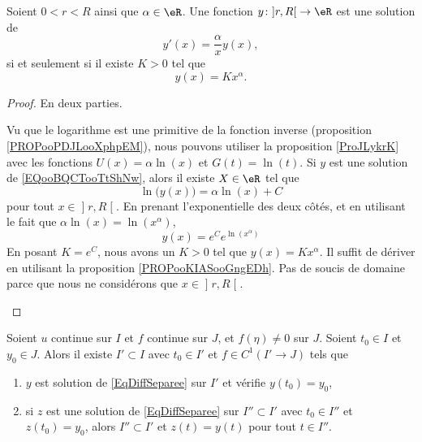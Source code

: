 \begin{proposition}     \label{PROPooIGWTooULXrKI}
	Soient \( 0<r<R\) ainsi que \( \alpha\in \eR\). Une fonction \( y\colon \mathopen] r , R \mathclose[\to \eR\) est une solution de
	\begin{equation}        \label{EQooBQCTooTtShNw}
		y'(x)=\frac{ \alpha }{ x }y(x),
	\end{equation}
	si et seulement si il existe \( K >0\) tel que
	\begin{equation}
		y(x)=Kx^{\alpha}.
	\end{equation}
\end{proposition}

\begin{proof}
	En deux parties.
	\begin{subproof}
		\spitem[\( \Rightarrow\)]
		Vu que le logarithme est une primitive de la fonction inverse (proposition \ref{PROPooPDJLooXphpEM}), nous pouvons utiliser la proposition \ref{ProJLykrK} avec les fonctions \( U(x)=\alpha\ln(x)\) et \( G(t)=\ln(t)\). Si \( y\) est une solution de \eqref{EQooBQCTooTtShNw}, alors il existe \( X\in \eR\) tel que
		\begin{equation}
			\ln\big( y(x) \big)=\alpha\ln(x)+C
		\end{equation}
		pour tout \( x\in\mathopen] r , R \mathclose[\). En prenant l'exponentielle des deux côtés, et en utilisant le fait que \( \alpha\ln(x)=\ln(x^{\alpha})\),
		\begin{equation}
			y(x)= e^{C} e^{\ln(x^{\alpha})}
		\end{equation}
		En posant \( K=e^C\), nous avons un \( K>0\) tel que \( y(x)=Kx^{\alpha}\).
		\spitem[\( \Leftarrow\)]
		Il suffit de dériver en utilisant la proposition \ref{PROPooKIASooGngEDh}. Pas de soucis de domaine parce que nous ne considérons que \( x\in \mathopen] r , R \mathclose[\).
	\end{subproof}
\end{proof}

\begin{proposition} \label{PropOkmXmC}
	Soient \( u\) continue sur \( I\) et \( f\) continue sur \( J\), et \( f(\eta)\neq 0\) sur \( J\). Soient \( t_0\in I\) et \( y_0\in J\). Alors il existe \( I'\subset I\) avec \( t_0\in I'\) et \( f\in C^1(I'\to J)\) tels que
	\begin{enumerate}

		\item
		      \( y\) est solution de \eqref{EqDiffSeparee} sur \( I'\) et vérifie \( y(t_0)=y_0\),
		\item
		      si \( z\) est une solution de \eqref{EqDiffSeparee} sur \( I''\subset I'\) avec \( t_0\in I''\) et \( z(t_0)=y_0\), alors \( I''\subset I'\) et \( z(t)=y(t)\) pour tout \( t\in I''\).

	\end{enumerate}
\end{proposition}

